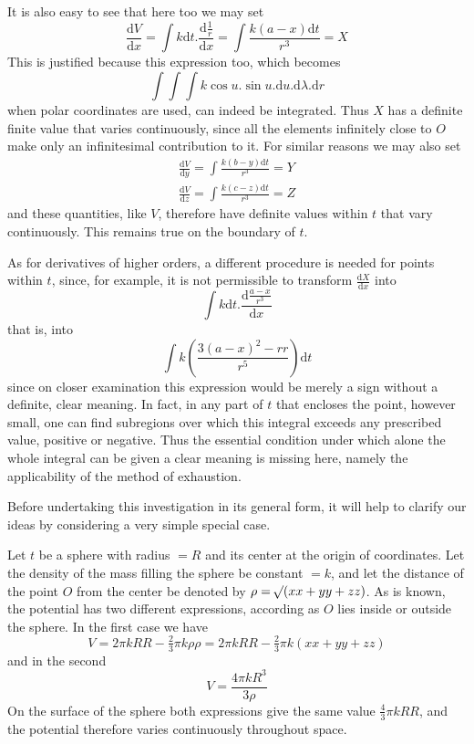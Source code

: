 It is also easy to see that here too we may set
\[
\frac{\mathrm{d}V}{\mathrm{d}x}=\int k\mathrm{d}t.\frac{\mathrm{d}\frac{1}{r}}{\mathrm{d}x}=\int\frac{k(a-x)\mathrm{d}t}{r^3}=X
\]
This is justified because this expression too, which becomes
\[
\int\!\int\!\int k\cos u.\sin u.\mathrm{d}u.\mathrm{d}\lambda.\mathrm{d}r
\]
when polar coordinates are used, can indeed be integrated. Thus $X$ has a definite finite value that varies continuously, since all the elements infinitely close to $O$ make only an infinitesimal contribution to it. For similar reasons we may also set
\[
\begin{array}{l}
\displaystyle\frac{\mathrm{d}V}{\mathrm{d}y}=\int\frac{k(b-y)\mathrm{d}t}{r^3}=Y\\[6pt]
\displaystyle\frac{\mathrm{d}V}{\mathrm{d}z}=\int\frac{k(c-z)\mathrm{d}t}{r^3}=Z
\end{array}
\]
and these quantities, like $V$, therefore have definite values within $t$ that vary continuously. This remains true on the boundary of $t$.

As for derivatives of higher orders, a different procedure is needed for points within $t$, since, for example, it is not permissible to transform $\frac{\mathrm{d}X}{\mathrm{d}x}$ into
\[
\int k\mathrm{d}t.\frac{\mathrm{d}\frac{a-x}{r^3}}{\mathrm{d}x}
\]
that is, into
\[
\int k(\frac{3(a-x)^2-rr}{r^5})\mathrm{d}t
\]
since on closer examination this expression would be merely a sign without a definite, clear meaning. In fact, in any part of $t$ that encloses the point, however small, one can find subregions over which this integral exceeds any prescribed value, positive or negative. Thus the essential
condition under which alone the whole integral can be given a clear meaning is missing here, namely the applicability of the method of exhaustion.

Before undertaking this investigation in its general form, it will help to clarify our ideas by considering a very simple special case.

Let $t$ be a sphere with radius $=R$ and its center at the origin of coordinates. Let the density of the mass filling the sphere be constant $=k$, and let the distance of the point $O$ from the center be denoted by $\rho=\mathord{{}^{}\!\surd}(xx+yy+zz)$. As is known, the potential has two different expressions, according as $O$ lies inside or outside the sphere. In the first case we have
\[
V=2\pi kRR-\tfrac{2}{3}\pi k\rho\rho=2\pi kRR-\tfrac{2}{3}\pi k(xx+yy+zz)
\]
and in the second
\[
V=\frac{4\pi kR^3}{3\rho}
\]
On the surface of the sphere both expressions give the same value $\tfrac{4}{3}\pi kRR$, and the potential therefore varies continuously throughout space.

